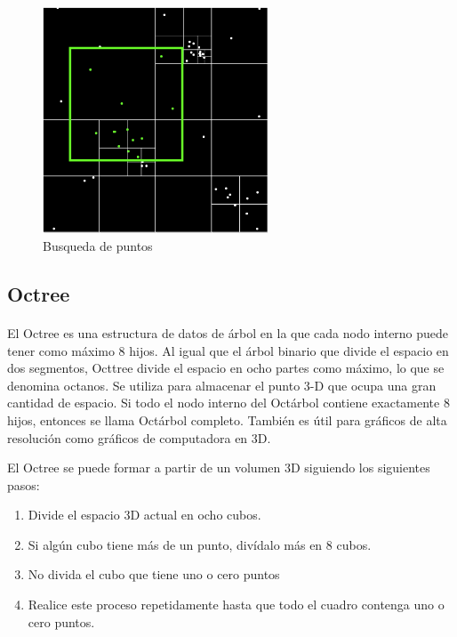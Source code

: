 \documentclass{article}
\begin{document}
\begin{figure}[htbp]
\centering
\includegraphics[width=0.6\textwidth]{img/quadtree_search.png}
\caption{Busqueda de puntos}
\label{fig:quadtree_search}
\end{figure}

\subsection{Octree}
\paragraph{}
 El Octree es una estructura de datos de árbol en la que cada nodo interno puede tener como máximo 8 hijos. Al igual que el árbol binario que divide el espacio en dos segmentos, Octtree divide el espacio en ocho partes como máximo, lo que se denomina octanos. Se utiliza para almacenar el punto 3-D que ocupa una gran cantidad de espacio. Si todo el nodo interno del Octárbol contiene exactamente 8 hijos, entonces se llama Octárbol completo. También es útil para gráficos de alta resolución como gráficos de computadora en 3D.
           
El Octree se puede formar a partir de un volumen 3D siguiendo los siguientes pasos:
           
\begin{enumerate}

\item Divide el espacio 3D actual en ocho cubos.
\item Si algún cubo tiene más de un punto, divídalo más en 8 cubos.
\item No divida el cubo que tiene uno o cero puntos
\item Realice este proceso repetidamente hasta que todo el cuadro contenga uno o cero puntos.
\end{enumerate}
\end{document}
